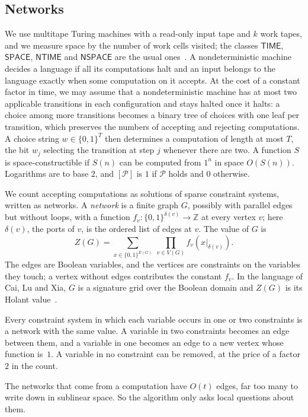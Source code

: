 \documentclass[11pt]{article}
\theoremstyle{definition}
\theoremstyle{definition}
\theoremstyle{remark}
\newcommand{\NTIME}{\mathsf{NTIME}}
\newcommand{\TIME}{\mathsf{TIME}}
\newcommand{\SPACE}{\mathsf{SPACE}}
\newcommand{\NSPACE}{\mathsf{NSPACE}}
\newcommand{\Z}{\mathbb{Z}}
\begin{document}
\subsection{Networks}\label{sec:prelims}

We use multitape Turing machines with a read-only input tape and $k$ work tapes, and we measure space by the number of work cells visited; the classes $\TIME$, $\SPACE$, $\NTIME$ and $\NSPACE$ are the usual ones~\cite{AB09}. A nondeterministic machine decides a language if all its computations halt and an input belongs to the language exactly when some computation on it accepts. At the cost of a constant factor in time, we may assume that a nondeterministic machine has at most two applicable transitions in each configuration and stays halted once it halts: a choice among more transitions becomes a binary tree of choices with one leaf per transition, which preserves the numbers of accepting and rejecting computations. A choice string $w\in\{0,1\}^T$ then determines a computation of length at most $T$, the bit $w_j$ selecting the transition at step $j$ whenever there are two. A function $S$ is space-constructible if $S(n)$ can be computed from $1^n$ in space $O(S(n))$. Logarithms are to base $2$, and $[\mathcal P]$ is $1$ if $\mathcal P$ holds and $0$ otherwise.

We count accepting computations as solutions of sparse constraint systems, written as networks. A \emph{network} is a finite graph $G$, possibly with parallel edges but without loops, with a function $f_v\colon\{0,1\}^{\delta(v)}\to\Z$ at every vertex $v$; here $\delta(v)$, the ports of $v$, is the ordered list of edges at $v$. The value of $G$ is
\[
Z(G)=\sum_{x\in\{0,1\}^{E(G)}}\ \prod_{v\in V(G)}f_v(x|_{\delta(v)}).
\]
The edges are Boolean variables, and the vertices are constraints on the variables they touch; a vertex without edges contributes the constant $f_v$. In the language of Cai, Lu and Xia, $G$ is a signature grid over the Boolean domain and $Z(G)$ is its Holant value~\cite{CLX09}.

Every constraint system in which each variable occurs in one or two constraints is a network with the same value. A variable in two constraints becomes an edge between them, and a variable in one becomes an edge to a new vertex whose function is~$1$. A variable in no constraint can be removed, at the price of a factor $2$ in the count.

The networks that come from a computation have $O(t)$ edges, far too many to write down in sublinear space. So the algorithm only asks local questions about them.
\end{document}
